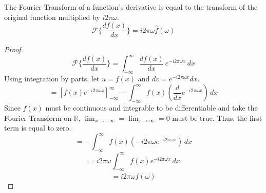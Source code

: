 \begin{lemma}
    The Fourier Transform of a function's derivative is equal to the transform of the original function multiplied by $i 2\pi \omega$.
    \[ \mathcal{F}\{ \frac{d f(x)}{dx} \} = i 2\pi \omega \hat{f}(\omega) \]
\end{lemma}

\begin{proof}
    \[ \mathcal{F}\{ \frac{d f(x)}{dx} \} = \int_{-\infty}^{\infty} \frac{d f(x)}{dx}  \, e^{-i 2\pi \omega x} \,dx \]
    Using integration by parts, let \(u = f(x)\) and \(dv = e^{-i 2\pi \omega x} dx\).
    \[ = \left[ f(x) e^{-i 2\pi \omega x} \right]_{-\infty}^{\infty} - \int_{-\infty}^{\infty} f(x) \left( \frac{d}{dx} e^{-i 2\pi \omega x} \right) \,dx \]
    Since \(f(x)\) must be continuous and integrable to be differentiable and take the Fourier Transform on \(\mathbb{R}\), \(\lim_{x \to -\infty}=\lim_{x \to \infty}=0\) must be true. Thus, the first term is equal to zero. 
    \[ = - \int_{-\infty}^{\infty} f(x) \left( -i 2\pi \omega e^{-i 2\pi \omega x} \right) \,dx \]
    \[ = i 2\pi \omega \int_{-\infty}^{\infty} f(x) e^{-i 2\pi \omega x} \,dx \]
    \[ = i 2\pi \omega \hat{f}(\omega) \]
\end{proof}
